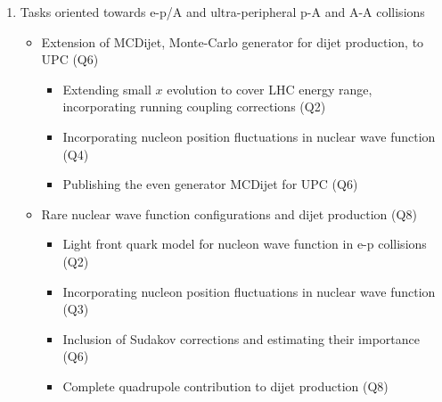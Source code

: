         \begin{enumerate}
            \item Tasks oriented towards e-p/A and  
				ultra-peripheral p-A and A-A collisions   
                \begin{itemize}
                    \item Extension of MCDijet,  Monte-Carlo generator 
						for dijet production, to UPC (Q6)
                        \begin{itemize}
                            \item Extending small $x$ evolution to cover 
								LHC energy range, incorporating running
								coupling corrections  (Q2)
                            \item Incorporating nucleon position fluctuations 
								in nuclear wave function (Q4)
                            \item Publishing the even generator MCDijet for UPC  (Q6)
                        \end{itemize}
                    \item Rare nuclear wave function configurations 
						and dijet production 
						(Q8)
                        \begin{itemize}
							\item Light front quark model for 
							nucleon wave function in e-p collisions (Q2) 
                            \item Incorporating nucleon position fluctuations 
								in nuclear wave function   (Q3)
                            \item Inclusion of Sudakov corrections and
								estimating their importance  (Q6)
                            \item   
								Complete quadrupole contribution to dijet production  (Q8)
                        \end{itemize}
                \end{itemize}
        \end{enumerate}
